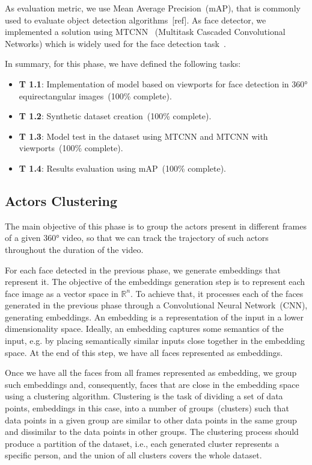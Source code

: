 As evaluation metric, we use Mean Average Precision~(mAP), that is commonly used to evaluate object detection algorithms~[ref]. As face detector, we implemented a solution using MTCNN~\cite{mtcnn} (Multitask Cascaded Convolutional Networks) which is widely used for the face detection task~\cite{mtcnn1, mtcnn2, mtcnn3}. %

In summary, for this phase, we have defined the following tasks:

\begin{itemize}
    \item \textbf{T 1.1}: Implementation of model based on viewports for face detection in 360° equirectangular images~(100\% complete).
    \item \textbf{T 1.2}: Synthetic dataset creation~(100\% complete).
    \item \textbf{T 1.3}: Model test in the dataset using MTCNN and MTCNN with viewports~(100\% complete).
    \item \textbf{T 1.4}: Results evaluation using mAP~(100\% complete).
\end{itemize}


\subsection{Actors Clustering}

The main objective of this phase is to group the actors present in different frames of a given 360° video, so that we can track the trajectory of such actors throughout the duration of the video. 

For each face detected in the previous phase, we generate embeddings that represent it.
The objective of the embeddings generation step is to represent each face image as a vector space in $\mathbb{R}^{n}$.
To achieve that, it processes each of the faces generated in the previous phase through a Convolutional Neural Network~(CNN), generating embeddings. 
An embedding is a representation of the input in a lower dimensionality space.
Ideally, an embedding captures some semantics of the input, e.g. by placing semantically similar inputs close together in the embedding space.
%
At the end of this step, we have all faces represented as embeddings.

Once we have all the faces from all frames represented as embedding, we group such embeddings and, consequently, faces that are close in the embedding space using a clustering algorithm. 
%
Clustering is the task of dividing a set of data points, embeddings in this case, into a number of groups~(clusters) such that data points in a given group are similar to other data points in the same group and dissimilar to the data points in other groups.
The clustering process should produce a partition of the dataset, i.e., each generated cluster represents a specific person, and the union of all clusters covers the whole dataset.

